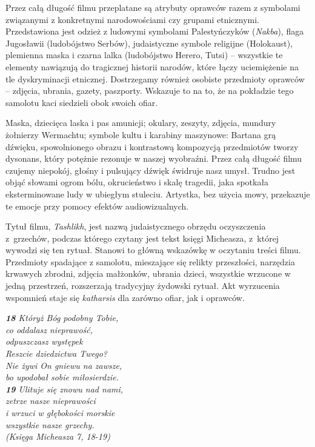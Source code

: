 \documentclass[14pt]{extarticle}
\begin{document}
Przez całą długość filmu przeplatane są atrybuty oprawców razem z symbolami związanymi z konkretnymi narodowościami czy grupami etnicznymi. Przedstawiona jest odzież z ludowymi symbolami Palestyńczyków (\textit{Nakba}), flaga Jugosławii (ludobójstwo Serbów), judaistyczne symbole religijne (Holokaust), plemienna maska i czarna lalka (ludobójstwo Herero, Tutsi) -- wszystkie te elementy nawiązują do tragicznej historii narodów, które łączy uciemiężenie na tle dyskryminacji etnicznej. Dostrzegamy również osobiste przedmioty oprawców -- zdjęcia, ubrania, gazety, paszporty. Wskazuje to na to, że na pokładzie tego samolotu kaci siedzieli obok swoich ofiar.

Maska, dziecięca laska i pas amunicji; okulary, zeszyty, zdjęcia, mundury żołnierzy Wermachtu; symbole kultu i karabiny maszynowe: Bartana grą dźwięku, spowolnionego obrazu i kontrastową kompozycją przedmiotów tworzy dysonans, który potężnie rezonuje w naszej wyobraźni. Przez całą długość filmu czujemy niepokój, głośny i pulsujący dźwięk świdruje nasz umysł. Trudno jest objąć słowami ogrom bólu, okrucieństwo i skalę tragedii, jaka spotkała eksterminowane ludy w ubiegłym stuleciu. Artystka, bez użycia mowy, przekazuje te emocje przy pomocy efektów audiowizualnych.

Tytuł filmu, \textit{Tashlikh}, jest nazwą judaistycznego obrzędu oczyszczenia z~grzechów, podczas którego czytany jest tekst księgi Micheasza, z~której wywodzi się ten rytuał. Stanowi to główną wskazówkę w oczytaniu treści filmu. Przedmioty spadające z samolotu, mieszające się relikty przeszłości, narzędzia krwawych zbrodni, zdjęcia małżonków, ubrania dzieci, wszystkie wrzucone w jedną przestrzeń, rozszerzają tradycyjny żydowski rytuał. Akt wyrzucenia wspomnień staje się \textit{katharsis} dla zarówno ofiar, jak i oprawców. 

\begin{center}
\textit{\textbf{18} Któryż Bóg podobny Tobie,\\
co oddalasz nieprawość,\\
odpuszczasz występek\\
Reszcie dziedzictwa Twego?\\
Nie żywi On gniewu na zawsze,\\
bo upodobał sobie miłosierdzie.\\
\textbf{19} Ulituje się znowu nad nami,\\
zetrze nasze nieprawości\\
i wrzuci w głębokości morskie\\
wszystkie nasze grzechy.\\
(Księga Micheasza 7, 18-19)}
\end{center}
\end{document}
